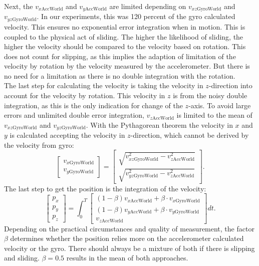 \documentclass[letterpaper, 10 pt, conference]{ieeeconf}  %
\begin{document}
 
 Next, the $v_{x\text{AccWorld}} $ and $v_{y\text{AccWorld}} $ are limited depending on $v_{xz\text{GyroWorld}} $ and $ v_{yz\text{GyroWorld}}$. In our experiments, this was 120 percent of the gyro calculated velocity.
 This ensures no exponential error integration when in motion.
 This is coupled to the physical act of sliding.
 The higher the likelihood of sliding, the higher the velocity should be compared to the velocity based on rotation.
 This does not count for slipping, as this implies the adaption of limitation of the velocity by rotation by the velocity measured by the accelerometer.
 But there is no need for a limitation as there is no double integration with the rotation.\\
 The last step for calculating the velocity is taking the velocity in $z$-direction into account for the velocity by rotation.
 This velocity in $z$ is from the noisy double integration, as this is the only indication for change of the $z$-axis.
 To avoid large errors and unlimited double error integration, $v_{z\text{AccWorld}} $ is limited to the mean of $v_{xz\text{GyroWorld}} $ and $ v_{yz\text{GyroWorld}}$.
With the Pythagorean theorem the velocity in $x$ and $y$ is calculated accepting the velocity in $z$-direction, which cannot be derived by the velocity from gyro:
 \begin{equation}
\begin{bmatrix}
v_{x\text{GyroWorld}} \\ v_{y\text{GyroWorld}}
\end{bmatrix} = 
\begin{bmatrix}
\sqrt{v_{xz\text{GyroWorld}}^2-v_{z\text{AccWorld}}^2}  \\ \sqrt{v_{yz\text{GyroWorld}}^2-v_{z\text{AccWorld}}^2 } 
\end{bmatrix}.
\end{equation}
The last step to get the position is the integration of the velocity:
\begin{equation}
\begin{bmatrix}
p_x \\ p_y \\p_z
\end{bmatrix}
 = \int_0^T \begin{bmatrix}
 (1-\beta)v_{x\text{AccWorld}} + \beta \cdot v_{x\text{GyroWorld}} 
 \\
  (1-\beta)v_{y\text{AccWorld}} + \beta \cdot v_{y\text{GyroWorld}} 
 \\
 v_{z\text{AccWorld}} 
 \end{bmatrix} dt.
\end{equation}
Depending on the practical circumstances and quality of measurement, the factor $\beta$ determines whether the position relies more on the accelerometer calculated velocity or the gyro.
There should always be a mixture of both if there is slipping and sliding.
$\beta =0.5$  results in the mean of both approaches.
\end{document}
